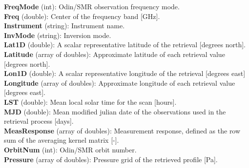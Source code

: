 \textbf{FreqMode} (int): Odin/SMR observation frequency mode. \\ %

\textbf{Freq} (double): Center of the frequency band [GHz]. \\ %

\textbf{Instrument} (string): Instrument name. \\ %

\textbf{InvMode} (string): Inversion mode. \\ %

\textbf{Lat1D} (double): A scalar representative latitude of the retrieval [degrees north]. \\ %

\textbf{Latitude} (array of doubles): Approximate latitude of each retrieval value [degrees north]. \\

\textbf{Lon1D} (double): A scalar representative longitude of the retrieval [degrees east] \\ %

\textbf{Longitude} (array of doubles): Approximate longitude of each retrieval value [degrees east]. \\

\textbf{LST} (double): Mean local solar time for the scan [hours]. \\ %

\textbf{MJD} (double): Mean modified julian date of the observations used in the retrieval process [days]. \\

\textbf{MeasResponse} (array of doubles): Measurement response, defined as the row sum of the averaging kernel matrix [-]. \\ %

\textbf{OrbitNum} (int): Odin/SMR orbit number. \\ %

\textbf{Pressure} (array of doubles): Pressure grid of the retrieved profile [Pa]. \\

